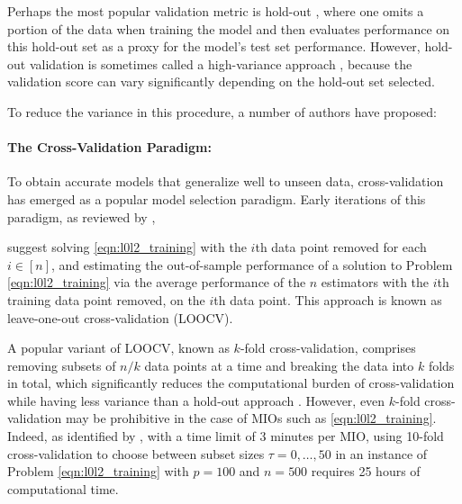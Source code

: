 \documentclass[ijoc,noblindrev]{informs3} %
\begin{document}
{\color{black} Perhaps the most popular validation metric is hold-out \citep{hastie2009elements}, where one omits a portion of the data when training the model and then evaluates performance on this hold-out set as a proxy for the model's test set performance. However, hold-out validation is sometimes called a high-variance approach \citep{hastie2009elements}, because the validation score can vary significantly depending on the hold-out set selected. 

To reduce the variance in this procedure, a number of authors have proposed:
}
\paragraph{The Cross-Validation Paradigm: }
To obtain accurate models that generalize well to unseen data, cross-validation has emerged as a popular model selection paradigm. {\color{black}Early iterations of this paradigm, as reviewed by} \citet{stone1978cross}, {\color{black}suggest solving \eqref{eqn:l0l2_training} with the $i$th data point removed for each $i \in [n]$, and estimating the out-of-sample performance of a solution to Problem \eqref{eqn:l0l2_training} via the average performance of the $n$ estimators with the $i$th training data point removed, on the $i$th data point. This approach is known as leave-one-out cross-validation (LOOCV). 

A popular variant of LOOCV, known as $k$-fold cross-validation, comprises removing subsets of $n/k$ data points at a time and breaking the data into $k$ folds in total, which significantly reduces the computational burden of cross-validation while having less variance than a hold-out approach \citep{burman1989comparative, arlot2010survey}. However, even $k$-fold cross-validation may be prohibitive in the case of MIOs such as \eqref{eqn:l0l2_training}. Indeed, as identified by \cite{hastie2020best}, with a time limit of 3 minutes per MIO, using 10-fold cross-validation to choose between subset sizes $\tau=0,\dots,50$ in an instance of Problem \eqref{eqn:l0l2_training} with $p=100$ and $n=500$ requires 25 hours of computational time.} 
\end{document}

